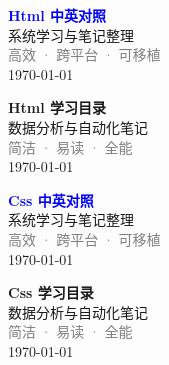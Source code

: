 \documentclass[UTF8, a4paper, 12pt]{ctexart}
\begin{document}

\clearpage

\thispagestyle{empty}
\vspace*{\fill}
\begin{center}
    \textcolor{blue}{\Huge\textbf{Html 中英对照}} \\[1em]
    \textcolor{blue!60!black}{\Large 系统学习与笔记整理} \\[2em]
    \textcolor{gray}{\large 高效 · 跨平台 · 可移植} \\[1m]
    \today
\end{center}
\vspace*{\fill}
\clearpage


\clearpage
\thispagestyle{empty}
\vspace*{\fill}
\begin{center}
    \textcolor{green!70!black}{\Huge\textbf{Html 学习目录}} \\[1em]
    \textcolor{green!40!black}{\Large 数据分析与自动化笔记} \\[2em]
    \textcolor{gray}{\large 简洁 · 易读 · 全能} \\[1em]
    \today
\end{center}
\vspace*{\fill}
\clearpage


\clearpage

\thispagestyle{empty}
\vspace*{\fill}
\begin{center}
    \textcolor{blue}{\Huge\textbf{Css 中英对照}} \\[1em]
    \textcolor{blue!60!black}{\Large 系统学习与笔记整理} \\[2em]
    \textcolor{gray}{\large 高效 · 跨平台 · 可移植} \\[1m]
    \today
\end{center}
\vspace*{\fill}
\clearpage


\clearpage
\thispagestyle{empty}
\vspace*{\fill}
\begin{center}
    \textcolor{green!70!black}{\Huge\textbf{Css 学习目录}} \\[1em]
    \textcolor{green!40!black}{\Large 数据分析与自动化笔记} \\[2em]
    \textcolor{gray}{\large 简洁 · 易读 · 全能} \\[1em]
    \today
\end{center}
\vspace*{\fill}
\clearpage


\clearpage
\end{document}
